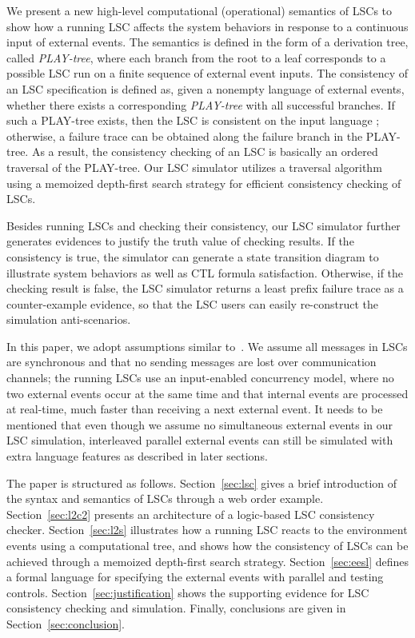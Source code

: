 \documentclass[]{llncs}
\begin{document}
We present a new high-level computational (operational)
semantics of LSCs to show how a running LSC affects the system
behaviors in response to a continuous input of external events.
The semantics is defined in the form of a derivation tree,
called {\em PLAY-tree}, where each branch from the root to
a leaf corresponds to a possible LSC run on a finite sequence of
external event inputs. The consistency of an LSC specification
 is defined as, given a nonempty language
 of external events, whether there exists a
corresponding {\em PLAY-tree} with all successful branches.
If such a PLAY-tree exists, then the LSC 
is consistent on the input language ;
otherwise, a failure trace can be obtained along
the failure branch in the PLAY-tree.
As a result, the consistency checking of an LSC is basically
an ordered traversal of the PLAY-tree.
Our LSC simulator utilizes a traversal algorithm using
a memoized depth-first search strategy for
efficient consistency checking of LSCs.

Besides running LSCs and checking their consistency, our
LSC simulator further generates evidences to justify the
truth value of checking results. If the consistency is
true, the simulator can generate a state transition
diagram to illustrate system behaviors as well as
CTL formula satisfaction. Otherwise, if the checking
result is false, the LSC simulator returns a least prefix
failure trace as a counter-example evidence, so that the
LSC users can easily re-construct the simulation anti-scenarios.

In this paper, we adopt assumptions similar to~\cite{HM03}.
We assume all messages in LSCs are synchronous
and that no sending messages are lost over communication channels;
the running LSCs use an input-enabled concurrency model, where
no two external events occur at the same time and
that internal events are processed at real-time,
much faster than receiving a next external event.
It needs to be mentioned that even though we
assume no simultaneous external events in our LSC simulation,
interleaved parallel external events can still be simulated
with extra language features as described in later sections.

The paper is structured as follows. Section~\ref{sec:lsc}
gives a brief introduction of the syntax and semantics of
LSCs through a web order example.
Section~\ref{sec:l2c2} presents an architecture of
a logic-based LSC consistency checker.
Section~\ref{sec:l2s} illustrates how a running LSC reacts to the
environment events using a computational tree, and shows
how the consistency of LSCs can be achieved through a memoized depth-first
search strategy.
Section~\ref{sec:eesl} defines a formal language
for specifying the external events with parallel and testing controls.
Section~\ref{sec:justification} shows the supporting evidence for
LSC consistency checking and simulation.
Finally, conclusions are given in Section~\ref{sec:conclusion}.
\end{document}
